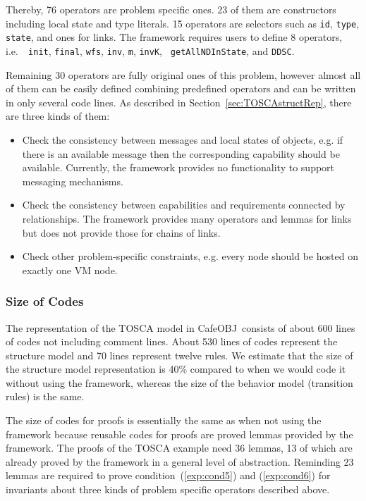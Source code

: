 \documentclass[12pt]{report}
\newcommand{\cafeobj}{{\sf CafeOBJ}~}
\begin{document}
Thereby, 76 operators are problem specific ones. 23 of them are
constructors including local state and type literals. 15 operators are
selectors such as {\tt id}, {\tt type}, {\tt state}, and ones for
links. The framework requires users to define 8 operators, i.e.\ {\tt
  init}, {\tt final}, {\tt wfs}, {\tt inv}, {\tt m}, {\tt invK}, {\tt
  getAllNDInState}, and {\tt DDSC}.

Remaining 30 operators are fully original ones of this problem,
however almost all of them can be easily defined combining predefined
operators and can be written in only several code lines. As described in
Section~\ref{sec:TOSCAstructRep}, there are three kinds of them:
\begin{itemize}
\item Check the consistency between messages and local states of
  objects, e.g. if there is an available message then the
  corresponding capability should be available. Currently, the
  framework provides no functionality to support messaging mechanisms.
\item Check the consistency between capabilities and requirements
  connected by relationships. The framework provides many operators
  and lemmas for links but does not provide those for chains of links.
\item Check other problem-specific constraints, e.g.  every node
  should be hosted on exactly one VM node.
\end{itemize}

\subsubsection{Size of Codes}
The representation of the TOSCA model in \cafeobj consists of about
600 lines of codes not including comment lines. About 530 lines of codes
represent the structure model and 70 lines represent twelve rules. We
estimate that the size of the structure model representation is 40\%
compared to when we would code it without using the framework, whereas
the size of the behavior model (transition rules) is the same.

The size of codes for proofs is essentially the same as when not using
the framework because reusable codes for proofs are proved lemmas
provided by the framework. The proofs of the TOSCA example need 36
lemmas, 13 of which are already proved by the framework in a general
level of abstraction. Reminding 23 lemmas are required to prove
condition~(\ref{exp:cond5}) and (\ref{exp:cond6}) for invariants about
three kinds of problem specific operators described above.
\end{document}
